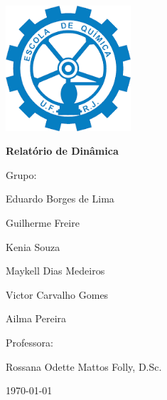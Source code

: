\begin{titlepage}
	\centering
	\includegraphics[width=0.35\textwidth,trim={0 0 0 4cm}]{figuras/capa/index.png}\par\vspace{1cm}
	{\LARGE\bfseries Relatório de Dinâmica}\par
	\vspace{0.1cm}
	{\Large Grupo:\par}
	\vspace{0.01cm}
	{\Large Eduardo Borges de Lima\par}
	{\Large Guilherme Freire \par}
	{\Large Kenia Souza \par}
	{\Large Maykell Dias Medeiros\par}
	{\Large Victor Carvalho Gomes \par}
	{\Large Ailma Pereira \par}
	{\Large \par}
	\vspace{0.2cm}
	\vspace{1cm}
	{\Large Professora:\par}
	\vspace{0.01cm}
	{\large Rossana Odette Mattos Folly, D.Sc.\par}
	\vfill
	
	{\large \today\par}
\end{titlepage}